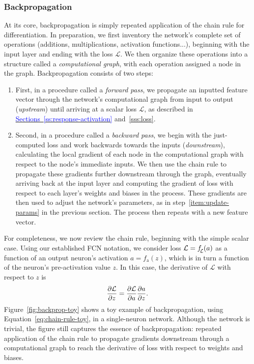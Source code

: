 \documentclass[11pt, a4paper]{article}
\newcommand{\myhref}[2]{\hyperref[#1]{\textcolor{blue}{#2}}}
\begin{document}
\subsubsection{Backpropagation}
At its core, backpropagation is simply repeated application of the chain rule for differentiation.
In preparation, we first inventory the network's complete set of operations (additions, multiplications, activation functions...), beginning with the input layer and ending with the loss $ \mathcal{L} $.
We then organize these operations into a structure called a \textit{computational graph}, with each operation assigned a node in the graph.
Backpropagation consists of two steps:
\begin{enumerate}

    \item First, in a procedure called a \textit{forward pass}, we propagate an inputted feature vector through the network's computational graph from input to output (\textit{upstream}) until arriving at a scalar loss $ \mathcal{L} $, as described in \myhref{ss:response-activation}{Sections~\ref{ss:response-activation}} and~\ref{sss:loss}.

    \item Second, in a procedure called a \textit{backward pass}, we begin with the just-computed loss and work backwards towards the inputs (\textit{downstream}), calculating the local gradient of each node in the computational graph with respect to the node's immediate inputs.
    We then use the chain rule to propagate these gradients further downstream through the graph, eventually arriving back at the input layer and computing the gradient of loss with respect to each layer's weights and biases in the process.
    These gradients are then used to adjust the network's parameters, as in step~\ref{item:update-params} in the previous section.
    The process then repeats with a new feature vector.

\end{enumerate}


For completeness, we now review the chain rule, beginning with the simple scalar case.
Using our established FCN notation, we consider loss $ \mathcal{L} = f_{\raisebox{-0.4ex}{\scalebox{0.7}{$\mspace{-3mu} \mathcal{L}$}}}(a) $ as a function of an output neuron's activation $ a = f_{\text{a}}(z) $, which is in turn a function of the neuron's pre-activation value $ z $.
In this case, the derivative of $ \mathcal{L} $ with respect to $ z $ is
\begin{equation}
    \pdv{\mathcal{L}}{z} = \pdv{\mathcal{L}}{a} \pdv{a}{z}. \label{eq:chain-rule-toy}
\end{equation}
Figure~\ref{fig:backprop-toy} shows a toy example of backpropagation, using Equation~\ref{eq:chain-rule-toy}, in a single-neuron network.
Although the network is trivial, the figure still captures the essence of backpropagation: repeated application of the chain rule to propagate gradients downstream through a computational graph to reach the derivative of loss with respect to weights and biases.
\end{document}
